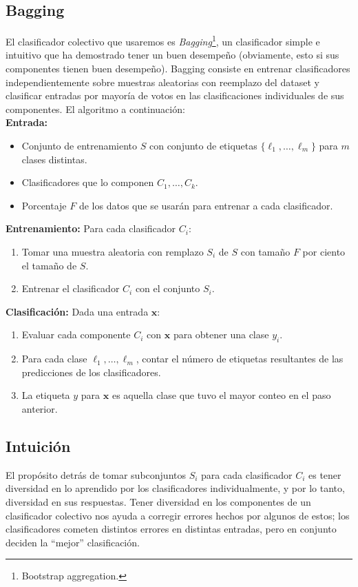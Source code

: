 \documentclass[spanish,11pt,letterpaper]{article}
\renewcommand{\vec}[1]{\mathbf{#1}}
\begin{document}
\subsection{Bagging}

El clasificador colectivo que usaremos es \textit{Bagging}\footnote{Bootstrap
aggregation.}, un clasificador simple e intuitivo que ha demostrado tener un buen
desempeño (obviamente, esto si sus componentes tienen buen desempeño). Bagging
consiste en entrenar clasificadores independientemente sobre muestras aleatorias
con reemplazo del dataset y clasificar entradas por mayoría de votos en las
clasificaciones individuales de sus componentes. El algoritmo a continuación:\\
\textbf{Entrada:}
\begin{itemize}
  \item Conjunto de entrenamiento $S$ con conjunto de etiquetas
  $\{\ell_1,\ldots,\ell_m\}$ para $m$ clases distintas.
  \item Clasificadores que lo componen $C_1,\ldots,C_k$.
  \item Porcentaje $F$ de los datos que se usarán para entrenar a cada clasificador.
\end{itemize}
\textbf{Entrenamiento:} Para cada clasificador $C_i$:
\begin{enumerate}
  \item Tomar una muestra aleatoria con remplazo $S_i$ de $S$ con tamaño $F$ por
  ciento el tamaño de $S$.
  \item Entrenar el clasificador $C_i$ con el conjunto $S_i$.
\end{enumerate}
\textbf{Clasificación:} Dada una entrada $\vec{x}$:
\begin{enumerate}
  \item Evaluar cada componente $C_i$ con $\vec{x}$ para obtener una clase $y_i$.
  \item Para cada clase $\ell_1,\ldots,\ell_m$, contar el número de etiquetas
  resultantes de las predicciones de los clasificadores.
  \item La etiqueta $y$ para $\vec{x}$ es aquella clase que tuvo el mayor conteo
  en el paso anterior.
\end{enumerate}

\subsection{Intuición}

El propósito detrás de tomar subconjuntos $S_i$ para cada clasificador $C_i$ es
tener diversidad en lo aprendido por los clasificadores individualmente, y por lo
tanto, diversidad en sus respuestas. Tener diversidad en los componentes de un
clasificador colectivo nos ayuda a corregir errores hechos por algunos de estos;
los clasificadores cometen distintos errores en distintas entradas, pero en conjunto
deciden la ``mejor'' clasificación.
\end{document}
